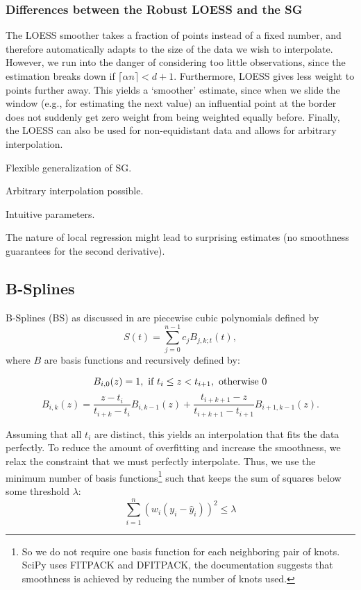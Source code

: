 		\subsubsection{Differences between the Robust LOESS and the SG}
		The LOESS smoother takes a fraction of points instead of a fixed number, and therefore automatically adapts to the size of the data we wish to interpolate. However, we run into the danger of considering too little observations, since the estimation breaks down if $\lceil \alpha n\rceil < d+1$.
		Furthermore, LOESS gives less weight to points further away. This yields a `smoother' estimate, since when we slide the window (e.g., for estimating the next value) an influential point at the border does not suddenly get zero weight from being weighted equally before.
		Finally, the LOESS can also be used for non-equidistant data and allows for arbitrary interpolation.

		\begin{my_pros_cons_table}{
				\item Flexible generalization of SG.
				\item Arbitrary interpolation possible.
				\item Intuitive parameters.
			}{
				\item The nature of local regression might lead to surprising estimates (no smoothness guarantees for the second derivative).
			}
		\end{my_pros_cons_table}


	\subsection{B-Splines}
		\label{sec:B}
		B-Splines (BS) as discussed in \cite{lycheSplineMethods2005} are piecewise cubic polynomials defined by 
		$$
			S(t)=\sum_{j=0}^{n-1} c_{j} B_{j, k ; t}(t),
		$$
		where $B$ are basis functions and recursively defined by:
		
		\begin{equation}
				B_{i, 0}(z)=1, \text { if } t_{i} \leq z<t_{i+1}, \text { otherwise } 0 \\
		\end{equation}
		\begin{equation}
			B_{i, k}(z)=\frac{z-t_{i}}{t_{i+k}-t_{i}} B_{i, k-1}(z)+\frac{t_{i+k+1}-z}{t_{i+k+1}-t_{i+1}} B_{i+1, k-1}(z).
		\end{equation}
		
		Assuming that all $t_i$ are distinct, this yields an interpolation that fits the data perfectly. To reduce the amount of overfitting and increase the smoothness, we relax the constraint that we must perfectly interpolate. Thus, we use the minimum number of basis functions\footnote{So we do not require one basis function for each neighboring pair of knots. SciPy uses FITPACK and DFITPACK, the documentation suggests that smoothness is achieved by reducing the number of knots used.} such that keeps the sum of squares below some threshold $\lambda$:
		$$\sum_{i=1}^n(w_i (y_i - \hat y_i))^2 \leq \lambda$$

